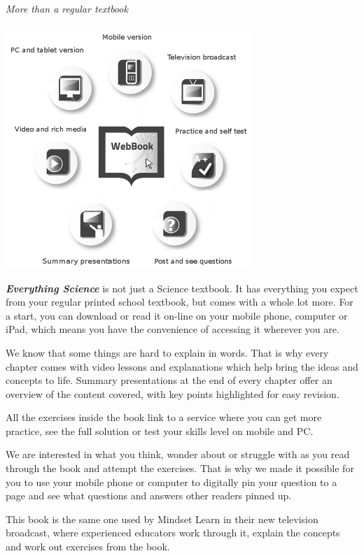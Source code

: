 
\newpage
\thispagestyle{empty}

{\normalfont\sffamily\fontsize{22}\normalfont\itshape More than a regular textbook} \par

\begin{center}
\includegraphics[width=0.70\textwidth]{title_images/morethantextbook.png}
\end{center}

\par
{\Large
\textbf{\textit{Everything Science}} is not just a Science textbook. It has everything you expect from
your regular printed school textbook, but comes with a whole lot more. For a start, you can download or read it
on-line on your mobile phone, computer or iPad, which means you have the convenience of accessing
it wherever you are.\par


We know that some things are hard to explain in words. That is why every chapter comes with video
lessons and explanations which help bring the ideas and concepts to life. Summary presentations at
the end of every chapter offer an overview of the content covered, with key points highlighted for easy
revision.\par


All the exercises inside the book link to a service where you can get more practice, see the full solution
or test your skills level on mobile and PC.\par


We are interested in what you think, wonder about or struggle with as you read through the book and
attempt the exercises. That is why we made it possible for you to use your mobile phone or computer to
digitally pin your question to a page and see what questions and answers other readers pinned up.\par


This book is the same one used by Mindset Learn in their new television broadcast, where experienced educators work through it, explain the concepts and work out exercises from the book.
}




